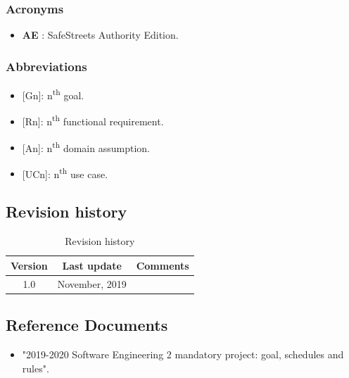 \documentclass{article}
\begin{document}
			\subsubsection{Acronyms}
				\begin{itemize}
					\item \textbf{AE} \label{AE}: SafeStreets Authority Edition.
				\end{itemize}
			\subsubsection{Abbreviations}
				\begin{itemize}
					\item {[Gn]}: n\textsuperscript{th} goal.
					\item {[Rn]}: n\textsuperscript{th} functional requirement.
					\item {[An]}: n\textsuperscript{th} domain assumption.
					\item {[UCn]}: n\textsuperscript{th} use case.
				\end{itemize}
		\subsection{Revision history}
			\begin{table}[h]
				\centering
				\begin{tabular}{c c c}
					\hline
					\textbf{Version} & \textbf{Last update} & \textbf{Comments} \\ 
					\hline
					1.0 &  \nth{10} November, 2019  & \\
					\hline
				\end{tabular}
				\caption{Revision history}
				\label{fig:Revision history}
			\end{table}
		
		\subsection{Reference Documents}
			\begin{itemize}
				\item "2019-2020 Software Engineering 2 mandatory project: goal, schedules and rules".
			\end{itemize}
			
\end{document}
